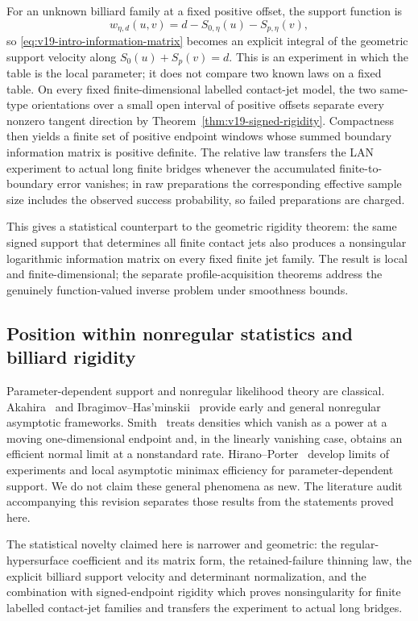 For an unknown billiard family at a fixed positive offset, the support
function is
\[
 w_{\eta,d}(u,v)=d-S_{0,\eta}(u)-S_{p,\eta}(v),
\]
so \eqref{eq:v19-intro-information-matrix} becomes an explicit integral of
the geometric support velocity along
$S_0(u)+S_p(v)=d$.  This is an experiment in which the table is the local
parameter; it does not compare two known laws on a fixed table.  On every
fixed finite-dimensional labelled contact-jet model, the two same-type
orientations over a small open interval of positive offsets separate every
nonzero tangent direction by
Theorem~\ref{thm:v19-signed-rigidity}.  Compactness then yields a finite set
of positive endpoint windows whose summed boundary information matrix is
positive definite.  The relative law transfers the LAN experiment to
actual long finite bridges whenever the accumulated finite-to-boundary
error vanishes; in raw preparations the corresponding effective sample
size includes the observed success probability, so failed preparations are
charged.

This gives a statistical counterpart to the geometric rigidity theorem:
the same signed support that determines all finite contact jets also
produces a nonsingular logarithmic information matrix on every fixed finite
jet family.  The result is local and finite-dimensional; the separate
profile-acquisition theorems address the genuinely function-valued inverse
problem under smoothness bounds.

\subsection{Position within nonregular statistics and billiard rigidity}
Parameter-dependent support and nonregular likelihood theory are classical.
Akahira~\cite{Akahira1975a,Akahira1975b} and
Ibragimov--Has'minskii~\cite{IbragimovHasminskii} provide early and general
nonregular asymptotic frameworks.  Smith~\cite{Smith1985} treats densities
which vanish as a power at a moving one-dimensional endpoint and, in the
linearly vanishing case, obtains an efficient normal limit at a nonstandard
rate.  Hirano--Porter~\cite{HiranoPorter} develop limits of experiments and
local asymptotic minimax efficiency for parameter-dependent support.  We do
not claim these general phenomena as new.  The literature audit accompanying
this revision separates those results from the statements proved here.

The statistical novelty claimed here is narrower and geometric: the
regular-hypersurface coefficient and its matrix form, the retained-failure
thinning law, the explicit billiard support velocity and determinant
normalization, and the combination with signed-endpoint rigidity which
proves nonsingularity for finite labelled contact-jet families and transfers
the experiment to actual long bridges.

